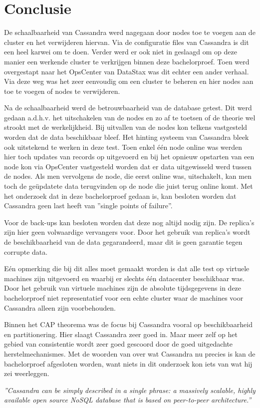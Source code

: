 \chapter{Conclusie}
\label{ch:conclusie}


De schaalbaarheid van Cassandra werd nagegaan door nodes toe te voegen aan de cluster en het verwijderen hiervan.
Via de configuratie files van Cassandra is dit een heel karwei om te doen.
Verder werd er ook niet in geslaagd om op deze manier een werkende cluster te verkrijgen binnen deze bachelorproef.
Toen werd overgestapt naar het OpsCenter van DataStax was dit echter een ander verhaal.
Via deze weg was het zeer eenvoudig om een cluster te beheren en hier nodes aan toe te voegen of nodes te verwijderen.

Na de schaalbaarheid werd de betrouwbaarheid van de database getest.
Dit werd gedaan a.d.h.v. het uitschakelen van de nodes en zo af te toetsen of de theorie wel strookt met de werkelijkheid.
Bij uitvallen van de nodes kon telkens vastgesteld worden dat de data beschikbaar bleef.
Het hinting systeem van Cassandra bleek ook uitstekend te werken in deze test.
Toen enkel één node online was werden hier toch updates van records op uitgevoerd en bij het opnieuw opstarten van een node kon via OpsCenter vastgesteld worden dat er data uitgewisseld werd tussen de nodes.
Als men vervolgens de node, die eerst online was, uitschakelt, kan men toch de geüpdatete data terugvinden op de node die juist terug online komt.
Met het onderzoek dat in deze bachelorproef gedaan is, kan besloten worden dat Cassandra geen last heeft van ''single points of failure''.

Voor de back-ups kan besloten worden dat deze nog altijd nodig zijn.
De replica's zijn hier geen volwaardige vervangers voor.
Door het gebruik van replica's wordt de beschikbaarheid van de data gegarandeerd, maar dit is geen garantie tegen corrupte data.

Eén opmerking die bij dit alles moet gemaakt worden is dat alle test op virtuele machines zijn uitgevoerd en waarbij er slechts één datacenter beschikbaar was.
Door het gebruik van virtuele machines zijn de absolute tijdsgegevens in deze bachelorproef niet representatief voor een echte cluster waar de machines voor Cassandra alleen zijn voorbehouden.

Binnen het CAP theorema was de focus bij Cassandra vooral op beschikbaarheid en partitionering.
Hier slaagt Cassandra zeer goed in.
Maar meer zelf op het gebied van consistentie wordt zeer goed gescoord door de goed uitgedachte herstelmechanismes.
Met de woorden van \cite{kan2014cassandra} over wat Cassandra nu precies is kan de bachelorproef afgesloten worden, want niets in dit onderzoek kon iets van wat hij zei weerleggen.

\emph{
	''Cassandra can be simply described in a single phrase: a massively scalable, highly available open source NoSQL database that is based on peer-to-peer architecture.''
}
\citep{kan2014cassandra}
